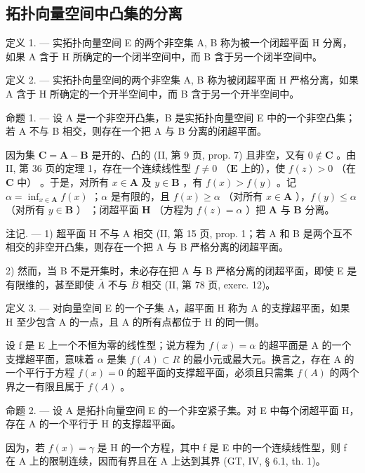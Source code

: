 \subsection{拓扑向量空间中凸集的分离}

定义 1. --- 实拓扑向量空间 E 的两个非空集 A, B 称为被一个闭超平面 H 分离，如果 A 含于 H 所确定的一个闭半空间中，而 B 含于另一个闭半空间中。

定义 2. --- 实拓扑向量空间的两个非空集 A, B 称为被闭超平面 H 严格分离，如果 A 含于 H 所确定的一个开半空间中，而 B 含于另一个开半空间中。

命题 1. --- 设 A 是一个非空开凸集，B 是实拓扑向量空间 E 中的一个非空凸集；若 A 不与 B 相交，则存在一个把 A 与 B 分离的闭超平面。

因为集 \(\mathbf{C} = \mathbf{A} - \mathbf{B}\) 是开的、凸的 (II, 第 9 页, prop. 7) 且非空，又有 \(0 \notin \mathbf{C}\) 。由 II, 第 36 页的定理 1，存在一个连续线性型 \(f \neq 0\) （\(\mathbf{E}\) 上的），使 \(f(z) > 0\) （在 \(\mathbf{C}\) 中） 。于是，对所有 \(x \in \mathbf{A}\) 及 \(y \in \mathbf{B}\) ，有 \(f(x) > f(y)\) 。记 \(\alpha = \inf_{x \in \mathbf{A}} f(x)\) ；\(\alpha\) 是有限的，且 \(f(x) \geqslant \alpha\) （对所有 \(x \in \mathbf{A}\) ），\(f(y) \leqslant \alpha\) （对所有 \(y \in \mathbf{B}\) ） ；闭超平面 \(\mathbf{H}\) （方程为 \(f(z) = \alpha\) ）把 \(\mathbf{A}\) 与 \(\mathbf{B}\) 分离。

注记. --- 1) 超平面 H 不与 A 相交 (II, 第 15 页, prop. 1；若 A 和 B 是两个互不相交的非空开凸集，则存在一个把 A 与 B 严格分离的闭超平面。

2) 然而，当 B 不是开集时，未必存在把 A 与 B 严格分离的闭超平面，即使 E 是有限维的，甚至即使 \(\overline{A}\) 不与 \(\overline{B}\) 相交 (II, 第 78 页, exerc. 12)。

定义 3. --- 对向量空间 E 的一个子集 A，超平面 H 称为 A 的支撑超平面，如果 H 至少包含 A 的一点，且 A 的所有点都位于 H 的同一侧。

设 f 是 E 上一个不恒为零的线性型；说方程为 \(f(x) = \alpha\) 的超平面是 A 的一个支撑超平面，意味着 \(\alpha\) 是集 \(f(A) \subset R\) 的最小元或最大元。换言之，存在 A 的一个平行于方程 \(f(x) = 0\) 的超平面的支撑超平面，必须且只需集 \(f(A)\) 的两个界之一有限且属于 \(f(A)\) 。

命题 2. --- 设 A 是拓扑向量空间 E 的一个非空紧子集。对 E 中每个闭超平面 H，存在 A 的一个平行于 H 的支撑超平面。

因为，若 \(f(x) = \gamma\) 是 H 的一个方程，其中 f 是 E 中的一个连续线性型，则 f 在 A 上的限制连续，因而有界且在 A 上达到其界 (GT, IV, § 6.1, th. 1)。

